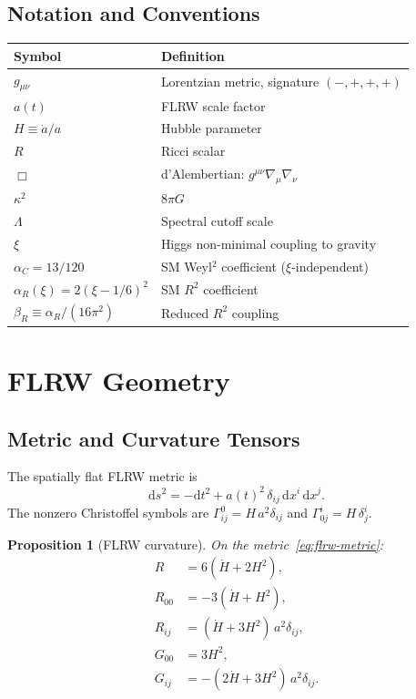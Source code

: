 \documentclass[11pt,a4paper]{article}
\renewcommand{\dd}{\mathrm{d}}
\theoremstyle{plain}
\newtheorem{proposition}[theorem]{Proposition}
\theoremstyle{definition}
\begin{document}
\subsection{Notation and Conventions}

\begin{center}
\begin{tabular}{ll}
\toprule
Symbol & Definition \\
\midrule
$g_{\mu\nu}$ & Lorentzian metric, signature $(-,+,+,+)$ \\
$a(t)$ & FLRW scale factor \\
$H \equiv \dot{a}/a$ & Hubble parameter \\
$R$ & Ricci scalar \\
$\Box$ & d'Alembertian: $g^{\mu\nu}\nabla_\mu\nabla_\nu$ \\
$\kappa^2$ & $8\pi G$ \\
$\Lambda$ & Spectral cutoff scale \\
$\xi$ & Higgs non-minimal coupling to gravity \\
$\alpha_C = 13/120$ & SM Weyl$^2$ coefficient ($\xi$-independent) \\
$\alpha_R(\xi) = 2(\xi - 1/6)^2$ & SM $R^2$ coefficient \\
$\beta_R \equiv \alpha_R/(16\pi^2)$ & Reduced $R^2$ coupling \\
\bottomrule
\end{tabular}
\end{center}

\section{FLRW Geometry}\label{sec:flrw}

\subsection{Metric and Curvature Tensors}

The spatially flat FLRW metric is
\begin{equation}\label{eq:flrw-metric}
  \dd s^2 = -\dd t^2 + a(t)^2\,\delta_{ij}\,\dd x^i\,\dd x^j.
\end{equation}
The nonzero Christoffel symbols are $\Gamma^0_{ij} = H\,a^2\delta_{ij}$
and $\Gamma^i_{0j} = H\,\delta^i_j$.

\begin{proposition}[FLRW curvature]\label{prop:flrw-curvature}
On the metric~\eqref{eq:flrw-metric}:
\begin{align}
  R &= 6(\dot{H} + 2H^2), \label{eq:R}\\
  R_{00} &= -3(\dot{H} + H^2), \label{eq:R00}\\
  R_{ij} &= (\dot{H} + 3H^2)\,a^2\delta_{ij}, \label{eq:Rij}\\
  G_{00} &= 3H^2, \label{eq:G00}\\
  G_{ij} &= -(2\dot{H} + 3H^2)\,a^2\delta_{ij}. \label{eq:Gij}
\end{align}
\end{proposition}
\end{document}
